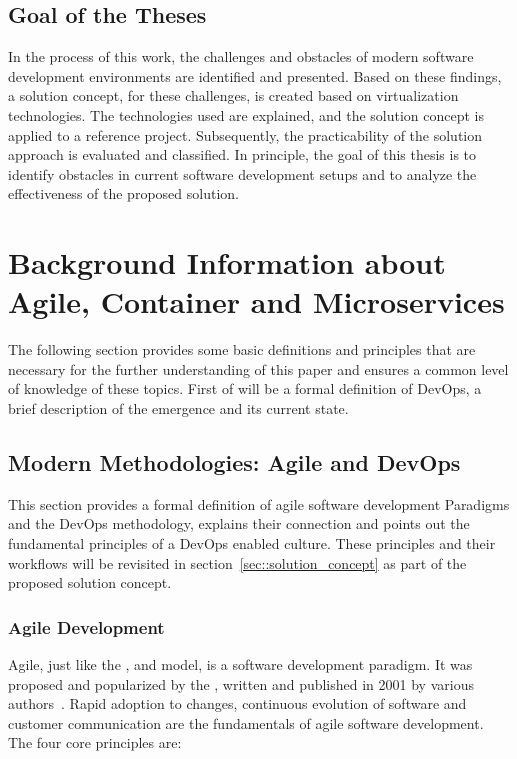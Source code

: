 \documentclass[12pt, a4paper]{article}
\begin{document}
    \subsection{Goal of the Theses}
    In the process of this work, the challenges and obstacles of modern software development environments are identified and presented. Based on these findings, a solution concept, for these challenges, is created based on virtualization technologies. The technologies used are explained, and the solution concept is applied to a reference project. Subsequently, the practicability of the solution approach is evaluated and classified. In principle, the goal of this thesis is to identify obstacles in current software development setups and to analyze the effectiveness of the proposed solution.\newpage

\section{Background Information about Agile, Container and Microservices}\label{sec::backgrund}
The following section provides some basic definitions and principles that are necessary for the further understanding of this paper and ensures a common level of knowledge of these topics.\newline
First of will be a formal definition of DevOps, a brief description of the emergence and its current state.
    \subsection{Modern Methodologies: Agile and DevOps}\label{ssec::devops}
    This section provides a formal definition of agile software development Paradigms and the DevOps methodology, explains their connection and points out the fundamental principles of a DevOps enabled culture. These principles and their workflows will be revisited in section~\ref{sec::solution_concept} as part of the proposed solution concept.

        \subsubsection{Agile Development}
        Agile, just like the ,  and  model, is a software development paradigm. It was proposed and popularized by the , written and published in 2001 by various authors~\cite{manifesto}. Rapid adoption to changes, continuous evolution of software and customer communication are the fundamentals of agile software development.\newline
        The four core principles are:
\end{document}
